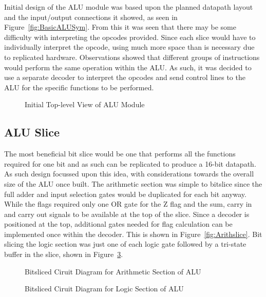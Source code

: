 Initial design of the ALU module was based upon the planned datapath layout and the input/output connections it showed, as seen in Figure~\ref{fig:BasicALUSym}. From this it was seen that there may be some difficulty with interpreting the opcodes provided. Since each slice would have to individually interpret the opcode, using much more space than is necessary due to replicated hardware. Observations showed that different groups of instructions would perform the same operation within the ALU. As such, it was decided to use a separate decoder to interpret the opcodes and send control lines to the ALU for the specific functions to be performed. 

\begin{figure}[h]
	\caption{Initial Top-level View of ALU Module}
	\label{fig:Basic ALUSym}
\end{figure}

\subsection{ALU Slice}
The most beneficial bit slice would be one that performs all the functions required for one bit and as such can be replicated to produce a 16-bit datapath. As such design focussed upon this idea, with considerations towards the overall size of the ALU once built. The arithmetic section was simple to bitslice since the full adder and input selection gates would be duplicated for each bit anyway. While the flags required only one OR gate for the Z flag and the sum, carry in and carry out signals to be available at the top of the slice. Since a decoder is positioned at the top, additional gates needed for flag calculation can be implemented once within the decoder. This is shown in Figure~\ref{fig:Arithslice}. Bit slicing the logic section was just one of each logic gate followed by a tri-state buffer in the slice, shown in Figure~\ref{fig:LogicSlice}. 

\begin{figure}[h]
	\caption{Bitsliced Ciruit Diagram for Arithmetic Section of ALU}
	\label{fig:ArithSlice}
\end{figure}

\begin{figure}[h]
	\caption{Bitsliced Ciruit Diagram for Logic Section of ALU}
	\label{fig:LogicSlice}
\end{figure}

